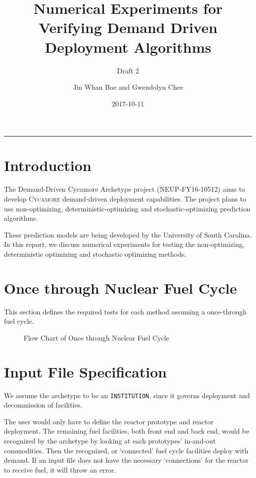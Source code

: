 \documentclass[12pt,letterpaper]{article}
\title{Numerical Experiments for Verifying Demand Driven Deployment Algorithms}
\subtitle{Draft 2}
\author{Jin Whan Bae and Gwendolyn Chee}
\date{2017-10-11}
\newcommand{\Cycamore}{\textsc{Cycamore}\xspace}%
\begin{document}
	
	\maketitle
	\hrule
	\onehalfspacing
	\thispagestyle{empty}

\section*{Introduction}
The Demand-Driven Cycamore Archetype project (NEUP-FY16-10512) aims to develop \Cycamore demand-driven deployment capabilities.
The project plans to use non-optimizing, deterministic-optimizing and stochastic-optimizing prediction algorithms.

These prediction models are being developed by the University of South Carolina. In this report, we discuss numerical experiments for testing the non-optimizing, deterministic optimizing and stochastic optimizing methods. 

\section{Once through Nuclear Fuel Cycle}
This section defines the required tests for
each method assuming a once-through fuel cycle.

\begin{figure}[H]
\caption{Flow Chart of Once through Nuclear Fuel Cycle}
\end{figure}

\section{Input File Specification}
We assume the archetype to be an \texttt{INSTITUTION}, since
it governs deployment and decommission of facilities.

The user would only have to define the reactor prototype and reactor deployment. 
The remaining fuel facilities,
both front end and back end, would be recognized by the archetype
by looking at each prototypes' in-and-out commodities.
Then the recognized, or `connected' fuel cycle facilities deploy
with demand.
If an input file does not have the necessary `connections' for the 
reactor to receive fuel, it will throw an error. 
\end{document}
